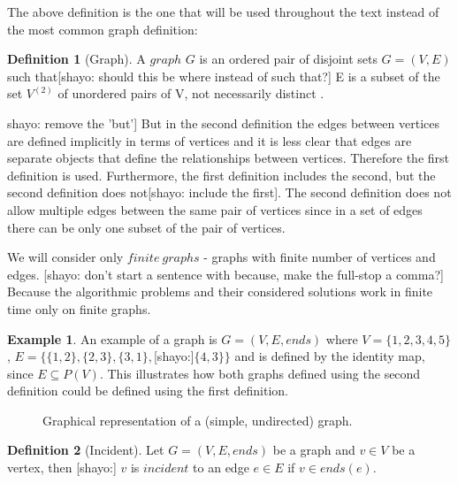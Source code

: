 \documentclass{report}
\theoremstyle{plain}
\theoremstyle{definition}
\newtheorem{definition}{Definition}
\newtheorem{example}{Example}
\theoremstyle{remark}
\numberwithin{definition}{chapter}
\numberwithin{example}{chapter}
\numberwithin{figure}{chapter}
\begin{document}
The above definition is the one that will be used throughout the text instead of the most common graph definition:

\begin{definition}[Graph]
A $graph$  $G$ is an ordered pair of disjoint sets $G = (V, E)$ such that[shayo: should this be where instead of such that?] E is a subset of the set $V^{(2)}$ of unordered pairs of V, not necessarily distinct \cite{bollobas1998modern}. 
\end{definition} 

{shayo: remove the 'but'] But in the second definition the edges between vertices are defined implicitly in terms of vertices and it is less clear that edges are separate objects that define the relationships between vertices. Therefore the first definition is used. Furthermore, the first definition includes the second, but the second definition does not[shayo: include the first]. The second definition does not allow multiple edges between the same pair of vertices since in a set of edges there can be only one subset of the pair of vertices.

We will consider only $finite \ graphs$ - graphs with finite number of vertices and edges. [shayo: don't start a sentence with because, make the full-stop a comma?] Because the algorithmic problems and their considered solutions work in finite time only on finite graphs.

\begin{example}
An example of a graph is $G=(V, E, ends)$ where $V=\{1,2,3,4,5\}$, $E=\{\{1,2\}, \{2,3\}, \{3,1\},$[shayo:]$\{4,3\}\}$ and is defined by the identity map, since $E \subseteq P(V)$. This illustrates how both graphs defined using the second definition could be defined using the first definition.

\begin{figure}[h]
\center
{}
\caption{Graphical representation of a (simple, undirected) graph.}
\end{figure}
\end{example}

\begin{definition}[Incident]
Let $G = (V, E, ends)$ be a graph and $v\in V$ be a vertex, then [shayo:] $v$ is $incident$ to an edge $e \in E$ if $v \in ends(e)$.
\end{definition}

}
\end{document}
